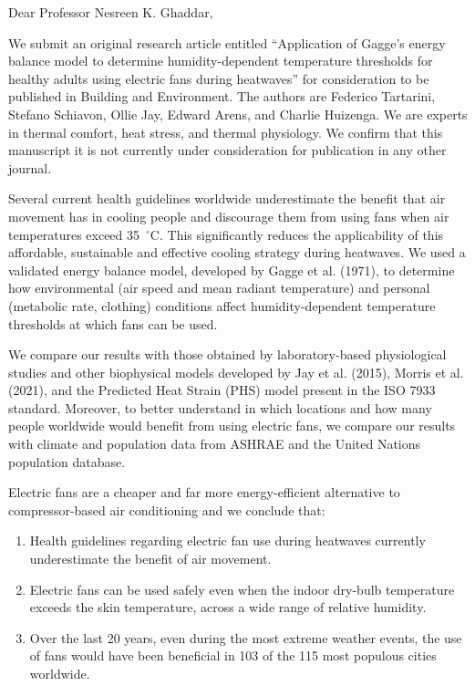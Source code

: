 \documentclass[11pt,a4paper,roman]{moderncv}        %
\begin{document}
\date{\today}
\opening{Dear Professor Nesreen K. Ghaddar,}

\makelettertitle

We submit an original research article entitled ``Application of Gagge's energy balance model to determine humidity-dependent temperature thresholds for healthy adults using electric fans during heatwaves'' for consideration to be published in Building and Environment.
The authors are Federico Tartarini, Stefano Schiavon, Ollie Jay, Edward Arens, and Charlie Huizenga.
We are experts in thermal comfort, heat stress, and thermal physiology.
We confirm that this manuscript it is not currently under consideration for publication in any other journal.

Several current health guidelines worldwide underestimate the benefit that air movement has in cooling people and discourage them from using fans when air temperatures exceed 35~$^{\circ}$C.
This significantly reduces the applicability of this affordable, sustainable and effective cooling strategy during heatwaves.
We used a validated energy balance model, developed by Gagge et al. (1971), to determine how environmental (air speed and mean radiant temperature) and personal (metabolic rate, clothing) conditions affect humidity-dependent temperature thresholds at which fans can be used.

We compare our results with those obtained by laboratory-based physiological studies and other biophysical models developed by Jay et al. (2015), Morris et al. (2021), and the Predicted Heat Strain (PHS) model present in the ISO 7933 standard. Moreover, to better understand in which locations and how many people worldwide would benefit from using electric fans, we compare our results with climate and population data from ASHRAE and the United Nations population database.

Electric fans are a cheaper and far more energy-efficient alternative to compressor-based air conditioning and we conclude that:
\begin{enumerate}[itemindent=.5cm,nolistsep]
    \item Health guidelines regarding electric fan use during heatwaves currently underestimate the benefit of air movement.
    \item Electric fans can be used safely even when the indoor dry-bulb temperature exceeds the skin temperature, across a wide range of relative humidity.
    \item Over the last 20 years, even during the most extreme weather events, the use of fans would have been beneficial in 103 of the 115 most populous cities worldwide.
\end{enumerate}
\end{document}
